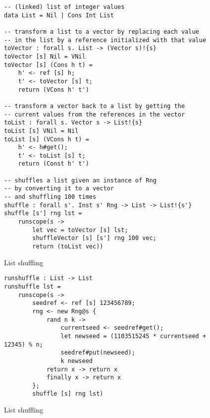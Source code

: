 \begin{figure}
\caption{List shuffling}
\begin{verbatim}
-- (linked) list of integer values
data List = Nil | Cons Int List

-- transform a list to a vector by replacing each value
-- in the list by a reference initialized with that value
toVector : forall s. List -> (Vector s)!{s}
toVector [s] Nil = VNil
toVector [s] (Cons h t) =
	h' <- ref [s] h;
	t' <- toVector [s] t;
	return (VCons h' t')

-- transform a vector back to a list by getting the
-- current values from the references in the vector
toList : forall s. Vector s -> List!{s}
toList [s] VNil = Nil
toList [s] (VCons h t) =
	h' <- h#get();
	t' <- toList [s] t;
	return (Const h' t')

-- shuffles a list given an instance of Rng
-- by converting it to a vector
-- and shuffling 100 times
shuffle : forall s'. Inst s' Rng -> List -> List!{s'}
shuffle [s'] rng lst =
	runscope(s ->
		let vec = toVector [s] lst;
		shuffleVector [s] [s'] rng 100 vec;
		return (toList vec))
\end{verbatim}
\label{fig:listshuffle}
\end{figure}

\begin{figure}
\caption{List shuffling}
\begin{verbatim}
runshuffle : List -> List
runshuffle lst =
	runscope(s ->
		seedref <- ref [s] 123456789;
		rng <- new Rng@s {
			rand n k ->
				currentseed <- seedref#get();
				let newseed = (1103515245 * currentseed + 12345) % n;
				seedref#put(newseed);
				k newseed
			return x -> return x
			finally x -> return x
		};
		shuffle [s] rng lst)
\end{verbatim}
\label{fig:rng}
\end{figure}

